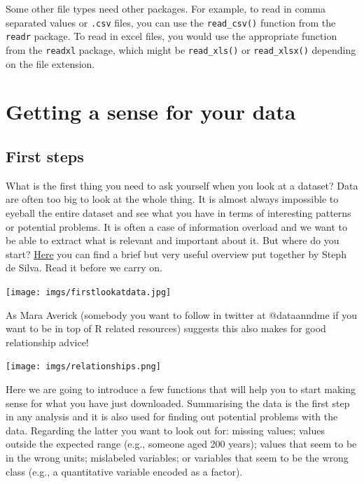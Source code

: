 \documentclass[
]{book}
\begin{document}
Some other file types need other packages. For example, to read in comma separated values or \texttt{.csv} files, you can use the \texttt{read\_csv()} function from the \texttt{readr} package. To read in excel files, you would use the appropriate function from the \texttt{readxl} package, which might be \texttt{read\_xls()} or \texttt{read\_xlsx()} depending on the file extension.

\hypertarget{getting-a-sense-for-your-data}{%
\section{Getting a sense for your data}\label{getting-a-sense-for-your-data}}

\hypertarget{first-steps}{%
\subsection{First steps}\label{first-steps}}

What is the first thing you need to ask yourself when you look at a dataset? Data are often too big to look at the whole thing. It is almost always impossible to eyeball the entire dataset and see what you have in terms of interesting patterns or potential problems. It is often a case of information overload and we want to be able to extract what is relevant and important about it. But where do you start? \href{http://rex-analytics.com/data-analysis-questions-to-ask-the-first-time/}{Here} you can find a brief but very useful overview put together by Steph de Silva. Read it before we carry on.

\texttt{[image: imgs/firstlookatdata.jpg]}

As Mara Averick (somebody you want to follow in twitter at @dataanndme if you want to be in top of R related resources) suggests this also makes for good relationship advice!

\texttt{[image: imgs/relationships.png]}

Here we are going to introduce a few functions that will help you to start making sense for what you have just downloaded. Summarising the data is the first step in any analysis and it is also used for finding out potential problems with the data. Regarding the latter you want to look out for: missing values; values outside the expected range (e.g., someone aged 200 years); values that seem to be in the wrong units; mislabeled variables; or variables that seem to be the wrong class (e.g., a quantitative variable encoded as a factor).
\end{document}
